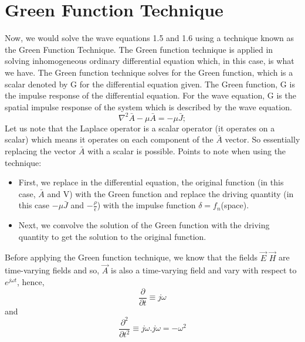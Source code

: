 \chapter{Green Function Technique}
	Now, we would solve the wave equations 1.5 and 1.6 using a technique known as the Green Function Technique. The Green function technique is applied in solving inhomogeneous ordinary differential equation which, in this case, is what we have. The Green function technique solves for the Green function, which is a scalar denoted by G for the differential equation given. The Green function, G is the impulse response of the differential equation. For the wave equation, G is the spatial impulse response of the system which is described by the wave equation. 
	$$\nabla^{2}\bar{A}-\mu\bar{A} = -\mu\bar{J};$$
	Let us note that the Laplace operator is a scalar operator (it operates on a scalar) which means it operates on each component of the $\bar{A}$ vector. So essentially replacing the vector $\bar{A}$ with a scalar is possible.
	Points to note when using the technique:
	\begin{itemize}
		\item First, we replace in the differential equation, the original function (in this case, $\bar{A}$ and V) with the Green function and replace the driving quantity (in this case $-\mu\bar{J}$ and $-\frac{\rho}{\epsilon}$) with the impulse function $\delta = f_{n}$(space).
		\item Next, we convolve the solution of the Green function with the driving quantity to get the solution to the original function.
	\end{itemize}
	\par Before applying the Green function technique, we know that the fields $\vec{E}$ $\vec{H}$ are time-varying fields and so, $\vec{A}$ is also a time-varying field and vary with respect to $e^{j\omega t}$, hence,
	$$\frac{\partial}{\partial t} \equiv j\omega $$ and  $$\frac{\partial^{2}}{\partial t^{2}} \equiv j\omega.j\omega = -\omega^{2}$$
	
